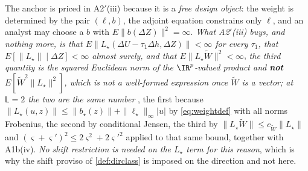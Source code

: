 \begin{remark}
The anchor is priced in A2$'$(iii) because it is a \emph{free design object}: the weight is determined by
the pair $(\ell,b)$, the adjoint equation constrains only $\ell$, and an analyst may choose a $b$ with
$E\|b(\Delta Z)\|^{2}=\infty$. \emph{What A2$'$(iii) buys, and nothing more, is that
$E\|L_\star(\Delta U-\tau_1\Delta h,\Delta Z)\|<\infty$ for every $\tau_1$, that
$E[\|L_\star\|\mid\Delta Z]<\infty$ almost surely, and that
$E\big\|L_\star\widetilde W\big\|^{2}<\infty$}, \emph{the third quantity is the squared Euclidean
norm of the $\IR^{p}$-valued product and \textbf{not} $E[\widetilde W^{2}\|L_\star\|^{2}]$, which is not
a well-formed expression once $\widetilde W$ is a vector; at $\mathsf L=2$ the two are the same number}
, the first because $\|L_\star(u,z)\|\le\|b_\star(z)\|+\|\ell_\star\|_\infty|u|$ by \eqref{eq:weightdef}
with all norms Frobenius,
the second by conditional Jensen, the third by
$\|L_\star\widetilde W\|\le c_{\widetilde W}\|L_\star\|$ and
$(\varsigma+\varsigma')^{2}\le2\varsigma^{2}+2\varsigma'^{2}$ applied to
that same bound, together with A1b(iv). \emph{No shift
restriction is needed on the $L_\star$ term for this reason}, which is why the shift proviso of
\cref{def:dirclass} is imposed on the direction and not here.
\end{remark}

